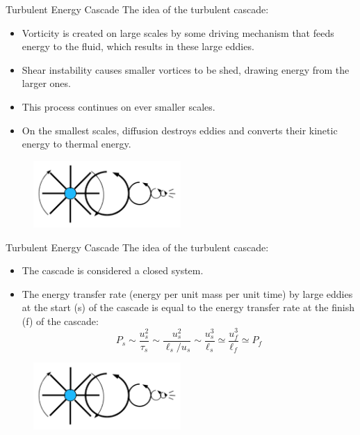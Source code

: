 
\begin{frame}{Turbulent Energy Cascade}
	The idea of the turbulent cascade:
	\begin{itemize}
		\item Vorticity is created on large scales by some driving mechanism that feeds energy to the fluid, which results in these large eddies.
		\item Shear instability causes smaller vortices to be shed, drawing energy from the larger ones.
		\item This process continues on ever smaller scales.
		\item On the smallest scales, diffusion destroys eddies and converts their kinetic energy to thermal energy.
	\end{itemize}
	
	\begin{figure}
		\includegraphics[width=0.5\textwidth]{scales3}
	\end{figure}
\end{frame}

\begin{frame}{Turbulent Energy Cascade}
	The idea of the turbulent cascade:
	\begin{itemize}
		\item The cascade is considered a closed system.
		\item The energy transfer rate (energy per unit mass per unit time) by large eddies at the start (s) of the cascade is equal to the energy transfer rate at the finish (f) of the cascade:
		$$P_s \sim \frac{u_s^2}{\tau_s} \sim \frac{u_s^2}{\ell_s / u_s} \sim \frac{u_s^3}{\ell_s} \simeq \frac{u_f^3}{\ell_f} \simeq P_f$$
	\end{itemize}
	
	\begin{figure}
		\includegraphics[width=0.5\textwidth]{scales3}
	\end{figure}
\end{frame}

